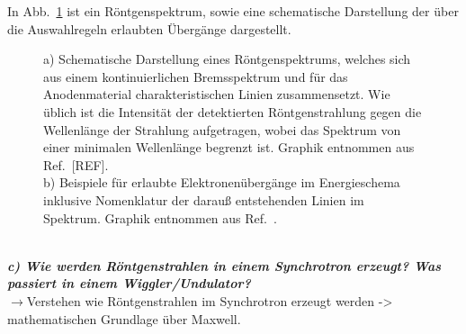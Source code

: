 In Abb.~\ref{fig:char} ist ein Röntgenspektrum, sowie eine schematische Darstellung der 
über die Auswahlregeln erlaubten Übergänge dargestellt.
\begin{figure}[h!]
    \centering
    \qquad
    \caption{\label{fig:char}a) Schematische Darstellung eines Röntgenspektrums, welches sich aus 
    einem kontinuierlichen Bremsspektrum und für das Anodenmaterial charakteristischen Linien zusammensetzt. 
    Wie üblich ist die Intensität der detektierten Röntgenstrahlung gegen die Wellenlänge der Strahlung aufgetragen, 
    wobei das Spektrum von einer minimalen Wellenlänge begrenzt ist. Graphik entnommen aus Ref.~[REF].\\
    b) Beispiele für erlaubte Elektronenübergänge im Energieschema inklusive Nomenklatur der darauß entstehenden Linien 
    im Spektrum. Graphik entnommen aus Ref.~\cite{Kristall}.}
\end{figure}\FloatBarrier \,\\

\textbf{\textit{c) Wie werden Röntgenstrahlen in einem Synchrotron erzeugt? Was passiert
in einem Wiggler/Undulator?}}\\
$\rightarrow$Verstehen wie Röntgenstrahlen im Synchrotron erzeugt werden -> mathematischen Grundlage über Maxwell.